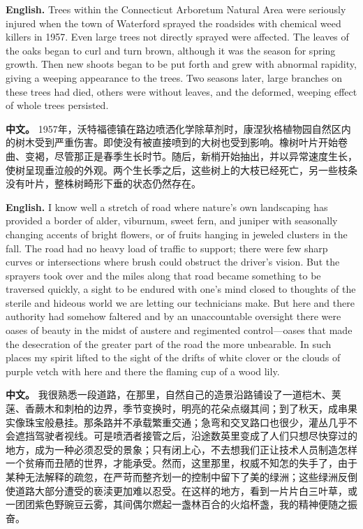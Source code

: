 \noindent\textbf{English.} Trees within the Connecticut Arboretum Natural Area were seriously injured when the town of Waterford sprayed the roadsides with chemical weed killers in 1957. Even large trees not directly sprayed were affected. The leaves of the oaks began to curl and turn brown, although it was the season for spring growth. Then new shoots began to be put forth and grew with abnormal rapidity, giving a weeping appearance to the trees. Two seasons later, large branches on these trees had died, others were without leaves, and the deformed, weeping effect of whole trees persisted.
\par
\noindent\textbf{中文。} 1957年，沃特福德镇在路边喷洒化学除草剂时，康涅狄格植物园自然区内的树木受到严重伤害。即使没有被直接喷到的大树也受到影响。橡树叶片开始卷曲、变褐，尽管那正是春季生长时节。随后，新梢开始抽出，并以异常速度生长，使树呈现垂泣般的外观。两个生长季之后，这些树上的大枝已经死亡，另一些枝条没有叶片，整株树畸形下垂的状态仍然存在。
\par\medskip

\noindent\textbf{English.} I know well a stretch of road where nature's own landscaping has provided a border of alder, viburnum, sweet fern, and juniper with seasonally changing accents of bright flowers, or of fruits hanging in jeweled clusters in the fall. The road had no heavy load of traffic to support; there were few sharp curves or intersections where brush could obstruct the driver's vision. But the sprayers took over and the miles along that road became something to be traversed quickly, a sight to be endured with one's mind closed to thoughts of the sterile and hideous world we are letting our technicians make. But here and there authority had somehow faltered and by an unaccountable oversight there were oases of beauty in the midst of austere and regimented control---oases that made the desecration of the greater part of the road the more unbearable. In such places my spirit lifted to the sight of the drifts of white clover or the clouds of purple vetch with here and there the flaming cup of a wood lily.
\par
\noindent\textbf{中文。} 我很熟悉一段道路，在那里，自然自己的造景沿路铺设了一道桤木、荚蒾、香蕨木和刺柏的边界，季节变换时，明亮的花朵点缀其间；到了秋天，成串果实像珠宝般悬挂。那条路并不承载繁重交通；急弯和交叉路口也很少，灌丛几乎不会遮挡驾驶者视线。可是喷洒者接管之后，沿途数英里变成了人们只想尽快穿过的地方，成为一种必须忍受的景象；只有闭上心，不去想我们正让技术人员制造怎样一个贫瘠而丑陋的世界，才能承受。然而，这里那里，权威不知怎的失手了，由于某种无法解释的疏忽，在严苛而整齐划一的控制中留下了美的绿洲；这些绿洲反倒使道路大部分遭受的亵渎更加难以忍受。在这样的地方，看到一片片白三叶草，或一团团紫色野豌豆云雾，其间偶尔燃起一盏林百合的火焰杯盏，我的精神便随之振奋。
\par\medskip

